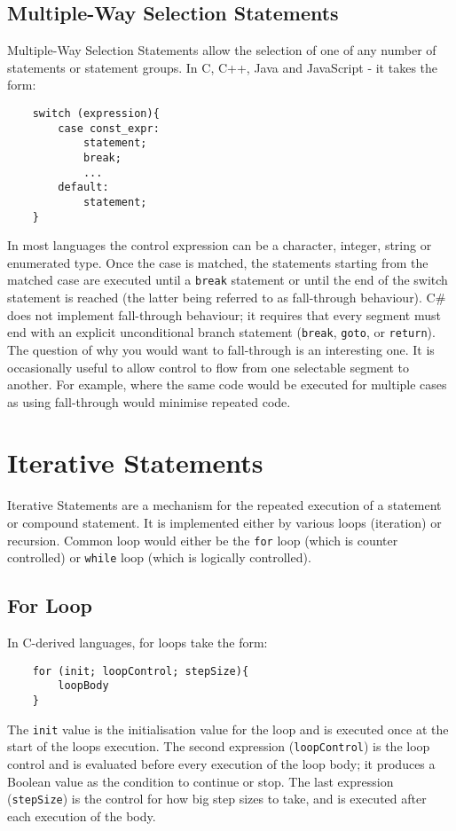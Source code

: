 \subsection{Multiple-Way Selection Statements}
Multiple-Way Selection Statements allow the selection of one of any number of statements or statement groups. In C, C++, Java and JavaScript - it takes the form:
\begin{verbatim}
    switch (expression){
        case const_expr:
            statement;
            break;
            ...
        default:
            statement;
    }
\end{verbatim}

In most languages the control expression can be a character, integer, string or enumerated type. Once the case is matched, the statements starting from the matched case are executed until a \verb|break| statement or until the end of the switch statement is reached (the latter being referred to as fall-through behaviour). C\# does not implement fall-through behaviour; it requires that every segment must end with an explicit unconditional branch statement (\verb|break|, \verb|goto|, or \verb|return|).\\

The question of why you would want to fall-through is an interesting one. It is occasionally useful to allow control to flow from one selectable segment to another. For example, where the same code would be executed for multiple cases as using fall-through would minimise repeated code.

\section{Iterative Statements}
Iterative Statements are a mechanism for the repeated execution of a statement or compound statement. It is implemented either by various loops (iteration) or recursion. Common loop would either be the \verb|for| loop (which is counter controlled) or \verb|while| loop (which is logically controlled). 

\subsection{For Loop}
In C-derived languages, for loops take the form:
\begin{verbatim}
    for (init; loopControl; stepSize){
        loopBody
    }
\end{verbatim}

The \verb|init| value is the initialisation value for the loop and is executed once at the start of the loops execution. The second expression (\verb|loopControl|) is the loop control and is evaluated before every execution of the loop body; it produces a Boolean value as the condition to continue or stop. The last expression (\verb|stepSize|) is the control for how big step sizes to take, and is executed after each execution of the body.\\

